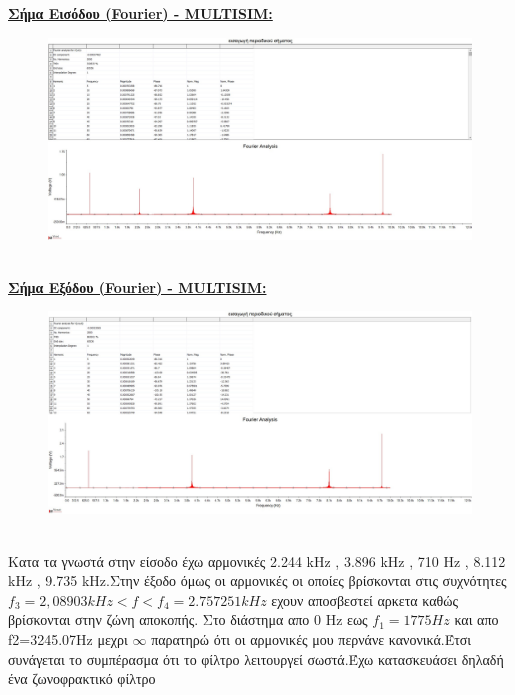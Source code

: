 \documentclass{article}
\begin{document}
{{\clearpage
\textbf{\underline{Σήμα Εισόδου (Fourier) - MULTISIM:}}
\begin{figure}[h!]
\centering
 	\advance\leftskip-0.5cm
  \includegraphics[width=130mm,scale=2]{thema3/multisim13.jpg}
\end{figure}  \\[1.4\baselineskip]
\textbf{\underline{Σήμα Εξόδου (Fourier) - MULTISIM:}}
\begin{figure}[h!]
\centering
 	\advance\leftskip-0.5cm
  \includegraphics[width=130mm,scale=2]{thema3/multisim14.jpg}
\end{figure} \\
\normalsize{}
Kατα τα γνωστά στην είσοδο έχω αρμονικές 2.244 kHz , 3.896 kHz , 710 Hz , 8.112 kHz , 9.735 kHz.Στην έξοδο όμως οι αρμονικές οι οποίες βρίσκονται στις συχνότητες $f_3=2,08903kHz < f < f_4 = 2.757251kHz$
εχουν αποσβεστεί αρκετα καθώς βρίσκονται στην ζώνη αποκοπής.
Στο διάστημα απο 0 Hz εως $f_1=1775Ηz$ και απο f2=3245.07Hz μεχρι $\infty$ παρατηρώ ότι οι αρμονικές
μου περνάνε κανονικά.Έτσι συνάγεται το συμπέρασμα ότι το φίλτρο λειτουργεί σωστά.Έχω κατασκευάσει δηλαδή ένα ζωνοφρακτικό φίλτρο
\large{}
\clearpage








}}
\end{document}

